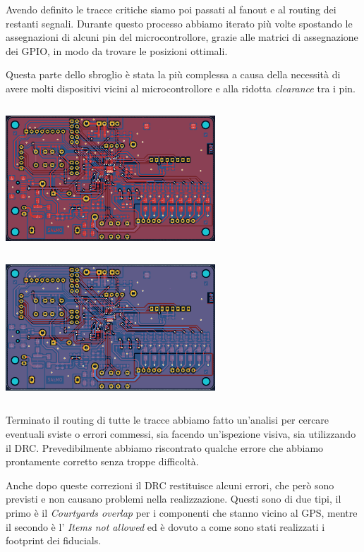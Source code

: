Avendo definito le tracce critiche siamo poi passati al fanout e al
routing dei restanti segnali. Durante questo processo abbiamo iterato
più volte spostando le assegnazioni di alcuni pin del microcontrollore,
grazie alle matrici di assegnazione dei GPIO, in modo da trovare le
posizioni ottimali.

Questa parte dello sbroglio è stata la più complessa a causa della
necessità di avere molti dispositivi vicini al microcontrollore e alla
ridotta \emph{clearance} tra i pin.

\includegraphics[width=3.09028in,height=2.15428in]{figures/image59.png}
\includegraphics[width=3.09028in,height=2.15428in]{figures/image22.png}
\begin{center}
\captionsetup{type=figure}
\end{center}

Terminato il routing di tutte le tracce abbiamo fatto un'analisi per
cercare eventuali sviste o errori commessi, sia facendo un'ispezione
visiva, sia utilizzando il DRC. Prevedibilmente abbiamo riscontrato
qualche errore che abbiamo prontamente corretto senza troppe difficoltà.

Anche dopo queste correzioni il DRC restituisce alcuni errori, che però
sono previsti e non causano problemi nella realizzazione. Questi sono di
due tipi, il primo è il \emph{Courtyards overlap} per i componenti che
stanno vicino al GPS, mentre il secondo è l' \emph{Items not allowed} ed
è dovuto a come sono stati realizzati i footprint dei fiducials.

